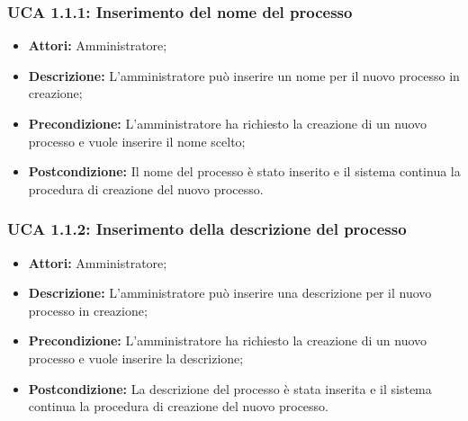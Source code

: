 \hypertarget{A1.1.1}{}
\subsubsection{UCA 1.1.1: Inserimento del nome del processo}
\begin{itemize}
\item \textbf{Attori:}
 Amministratore;
\item \textbf{Descrizione:} 
L'amministratore può inserire un nome per il nuovo processo in creazione; 
\item \textbf{Precondizione:}
 L'amministratore ha richiesto la creazione di un nuovo processo e vuole inserire il nome scelto;
\item \textbf{Postcondizione:} 
Il nome del processo è stato inserito e il sistema continua la procedura di creazione del nuovo processo.
\end{itemize}

\hypertarget{A1.1.2}{}
\subsubsection{UCA 1.1.2: Inserimento della descrizione del processo}
\begin{itemize}
\item \textbf{Attori:}
 Amministratore;
\item \textbf{Descrizione:} 
L'amministratore può inserire una descrizione per il nuovo processo in creazione; 
\item \textbf{Precondizione:}
 L'amministratore ha richiesto la creazione di un nuovo processo e vuole inserire la descrizione;
\item \textbf{Postcondizione:} 
La descrizione del processo è stata inserita e il sistema continua la procedura di creazione del nuovo processo.
\end{itemize}

\hypertarget{A1.2}{}
